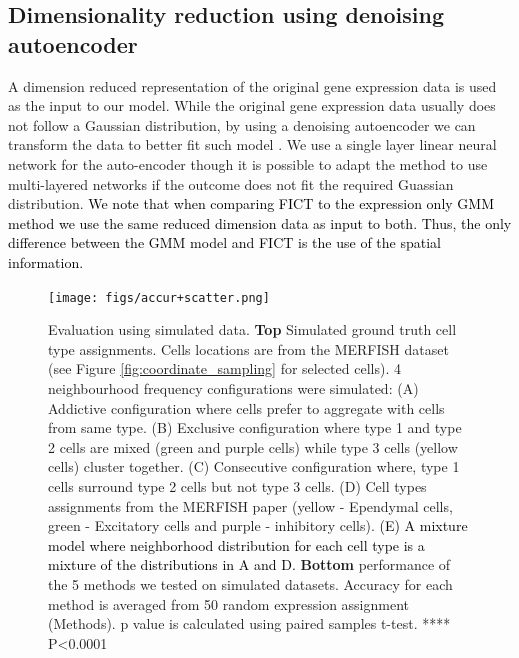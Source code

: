 \subsection{Dimensionality reduction using denoising autoencoder}
A dimension reduced representation of the original gene expression data is used as the input to our model. While the original gene expression data usually does not follow a Gaussian distribution, by using a denoising autoencoder we can transform the data to better fit such model \cite{vincent2008extracting}. We use a single layer linear neural network for the auto-encoder though it is possible to adapt the method to use multi-layered networks if the outcome does not fit the required Guassian distribution.  \textcolor{black}{We note that when comparing FICT to the expression only GMM method  we use the same reduced dimension data as input to both. Thus, the only difference between the GMM model and FICT is the use of the spatial information.}
\begin{figure}[hbt!]
    \texttt{[image: figs/accur+scatter.png]}
    \caption{Evaluation using simulated data. {\bf Top} Simulated ground truth cell type assignments. Cells locations are from the MERFISH dataset (see Figure \ref{fig:coordinate_sampling} for selected cells). 4 neighbourhood frequency configurations were simulated: (A) Addictive configuration where cells prefer to aggregate with cells from same type. (B) Exclusive configuration where type 1 and type 2 cells are mixed (green and purple cells) while type 3 cells (yellow cells) cluster together. (C) Consecutive configuration where, type 1 cells surround type 2 cells but not type 3 cells. (D) Cell types assignments from the MERFISH paper (yellow - Ependymal cells, green - Excitatory cells and purple -  inhibitory cells). \textcolor{black}{(E) A mixture  model where neighborhood distribution for each cell type is a mixture of the distributions in A and D.} {\bf Bottom} performance of the 5 methods we tested on simulated datasets. Accuracy for each method is averaged from 50 random expression assignment (Methods). p value is calculated using paired samples t-test. **** P<0.0001}\label{fig:simulate_accuracy2} \label{fig:coordinate_simulation2}
\end{figure}
